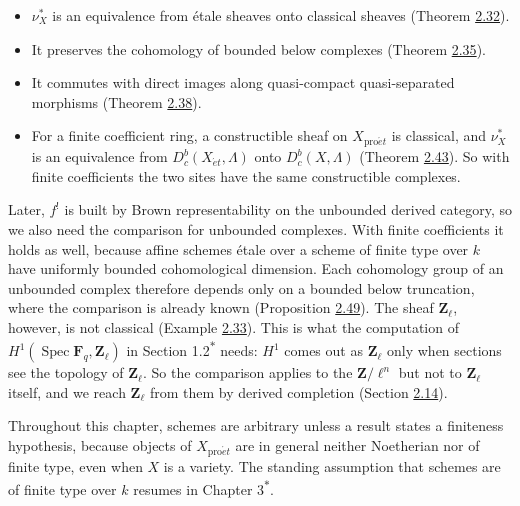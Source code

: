 \documentclass[11pt]{article}
\newcommand{\bpout}[1]{#1\textsuperscript{\hyperlink{bp-outside}{\ensuremath{\ast}}}}
\providecommand{\Dbc}{}\renewcommand{\Dbc}{D^b_c}
\begin{document}
\begin{itemize}
\item \(\nu_X^*\) is an equivalence from étale sheaves onto classical sheaves (Theorem \hyperref[bp93]{2.32}).
\item It preserves the cohomology of bounded below complexes (Theorem \hyperref[bp101]{2.35}).
\item It commutes with direct images along quasi-compact quasi-separated morphisms (Theorem \hyperref[bp111]{2.38}).
\item For a finite coefficient ring, a constructible sheaf on \(X_{\mathrm{pro}\acute{e}t}\) is classical, and \(\nu_X^*\) is an equivalence from \(D^b_c(X_{\acute{e}t},\Lambda)\) onto \(\Dbc(X,\Lambda)\) (Theorem \hyperref[bp127]{2.43}). So with finite coefficients the two sites have the same constructible complexes.
\end{itemize}

Later, \(f^!\) is built by Brown representability on the unbounded derived category, so we also need the comparison for unbounded complexes. With finite coefficients it holds as well, because affine schemes étale over a scheme of finite type over \(k\) have uniformly bounded cohomological dimension. Each cohomology group of an unbounded complex therefore depends only on a bounded below truncation, where the comparison is already known (Proposition \hyperref[bp144]{2.49}). The sheaf \(\mathbf Z_\ell\), however, is not classical (Example \hyperref[bp95]{2.33}). This is what the computation of \(H^1(\operatorname{Spec}\mathbf F_q,\mathbf Z_\ell)\) in Section \bpout{1.2} needs: \(H^1\) comes out as \(\mathbf Z_\ell\) only when sections see the topology of \(\mathbf Z_\ell\). So the comparison applies to the \(\mathbf Z/\ell^n\) but not to \(\mathbf Z_\ell\) itself, and we reach \(\mathbf Z_\ell\) from them by derived completion (Section \hyperref[bp177]{2.14}).

Throughout this chapter, schemes are arbitrary unless a result states a finiteness hypothesis, because objects of \(X_{\mathrm{pro}\acute{e}t}\) are in general neither Noetherian nor of finite type, even when \(X\) is a variety. The standing assumption that schemes are of finite type over \(k\) resumes in Chapter \bpout{3}.

\end{document}
